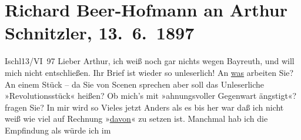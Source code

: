 

         
         \renewcommand{\erwaehntePersonen}{Personen: Paula Beer-Hofmann, Mirjam Beer-Hofmann, Paul Goldmann, Hugo von Hofmannsthal, Gustav Schwarzkopf}
         \renewcommand{\erwaehnteOrte}{Orte: Bad Ischl, Bayreuth, Traun, Wien}
         \renewcommand{\erwaehnteWerke}{Werke: Der grüne Kakadu. Groteske in einem Akt, Faust. Eine Tragödie}
               \section[Richard Beer-Hofmann an Arthur Schnitzler, 13. 6. 1897]{ Richard Beer-Hofmann an Arthur Schnitzler, 13. 6. 1897}\nopagebreak{}\rehead{ }\begin{ledgroupsized}[t]{13cm}\normalsize\beginnumbering \toendnotes[C]{\smallbreak\pagebreak[2]} 
\toendnotes[C]{\smallbreak}\pstart
           \centering{}{\pb}Ischl\hspace*{1.5em}13/VI 97\pend
           \pstart
           Lieber Arthur, ich weiß noch gar nichts wegen Bayreuth, und will mich nicht entschließen.\pend
           \pstart
           Ihr Brief ist wieder so unleserlich! An \uline{was} arbeiten
               Sie? An einem Stück – da Sie von Scenen sprechen aber soll das Unleser{\pb}liche »Revolutionsstück« heißen?\pend
           \pstart
           Ob mich’s mit »ahnungsvoller
                  Gegenwart ängstigt«? fragen Sie? In mir wird so Vieles jetzt Anders als es
               bis her war daß ich nicht weiß wie viel auf Rech{\pb}nung »\uline{davon}« zu setzen ist. Manchmal hab ich die Empfindung als würde ich im

\end{ledgroupsized}
